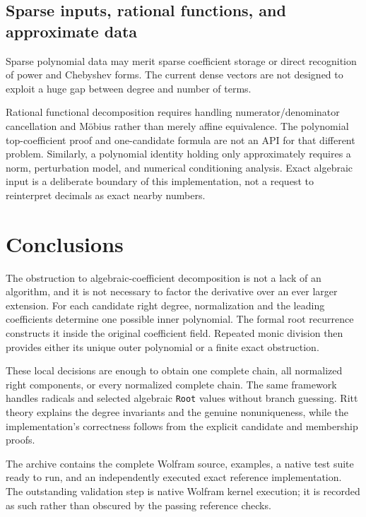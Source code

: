 \documentclass[11pt,letterpaper]{article}
\theoremstyle{definition}
\theoremstyle{remark}
\newcommand{\wt}[1]{\texttt{#1}}
\begin{document}
\subsection{Sparse inputs, rational functions, and approximate data}
Sparse polynomial data may merit sparse coefficient storage or direct
recognition of power and Chebyshev forms. The current dense vectors are
not designed to exploit a huge gap between degree and number of terms.

Rational functional decomposition requires handling numerator/denominator
cancellation and M\"obius rather than merely affine equivalence. The
polynomial top-coefficient proof and one-candidate formula are not an API
for that different problem. Similarly, a polynomial identity holding only
approximately requires a norm, perturbation model, and numerical
conditioning analysis. Exact algebraic input is a deliberate boundary
of this implementation, not a request to reinterpret decimals as exact
nearby numbers.

\section{Conclusions}
The obstruction to algebraic-coefficient decomposition is not a lack of
an algorithm, and it is not necessary to factor the derivative over an
ever larger extension. For each candidate right degree, normalization
and the leading coefficients determine one possible inner polynomial.
The formal root recurrence constructs it inside the original coefficient
field. Repeated monic division then provides either its unique outer
polynomial or a finite exact obstruction.

These local decisions are enough to obtain one complete chain, all
normalized right components, or every normalized complete chain. The
same framework handles radicals and selected algebraic \wt{Root}
values without branch guessing. Ritt theory explains the degree
invariants and the genuine nonuniqueness, while the implementation's
correctness follows from the explicit candidate and membership proofs.

The archive contains the complete Wolfram source, examples, a native
test suite ready to run, and an independently executed exact reference
implementation. The outstanding validation step is native Wolfram kernel
execution; it is recorded as such rather than obscured by the passing
reference checks.

\appendix
\end{document}
